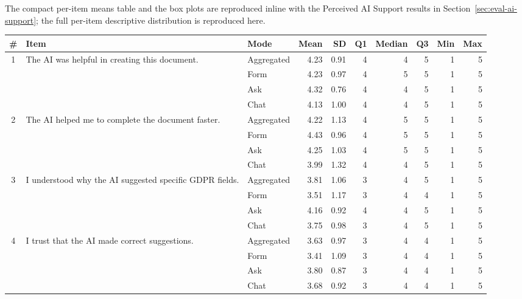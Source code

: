 The compact per-item means table and the box plots are reproduced
inline with the Perceived AI Support results in
Section~\ref{sec:eval-ai-support}; the full per-item descriptive
distribution is reproduced here.

\begin{table}
\centering
\small
\begin{tabularx}{\textheight}{@{}c X l r r r r r r r@{}}
\toprule
\# & Item & Mode & Mean & SD & Q1 & Median & Q3 & Min & Max \\
\midrule
\multirow{4}{*}{1} & \multirow{4}{*}{The AI was helpful in creating this document.}
                   & Aggregated  & 4.23 & 0.91 & 4 & 4 & 5 & 1 & 5 \\
                   & & Form & 4.23 & 0.97 & 4 & 5 & 5 & 1 & 5 \\
                   & & Ask  & 4.32 & 0.76 & 4 & 4 & 5 & 1 & 5 \\
                   & & Chat & 4.13 & 1.00 & 4 & 4 & 5 & 1 & 5 \\
\midrule
\multirow{4}{*}{2} & \multirow{4}{*}{The AI helped me to complete the document faster.}
                   & Aggregated  & 4.22 & 1.13 & 4 & 5 & 5 & 1 & 5 \\
                   & & Form & 4.43 & 0.96 & 4 & 5 & 5 & 1 & 5 \\
                   & & Ask  & 4.25 & 1.03 & 4 & 5 & 5 & 1 & 5 \\
                   & & Chat & 3.99 & 1.32 & 4 & 4 & 5 & 1 & 5 \\
\midrule
\multirow{4}{*}{3} & \multirow{4}{*}{I understood why the AI suggested specific GDPR fields.}
                   & Aggregated  & 3.81 & 1.06 & 3 & 4 & 5 & 1 & 5 \\
                   & & Form & 3.51 & 1.17 & 3 & 4 & 4 & 1 & 5 \\
                   & & Ask  & 4.16 & 0.92 & 4 & 4 & 5 & 1 & 5 \\
                   & & Chat & 3.75 & 0.98 & 3 & 4 & 5 & 1 & 5 \\
\midrule
\multirow{4}{*}{4} & \multirow{4}{*}{I trust that the AI made correct suggestions.}
                   & Aggregated  & 3.63 & 0.97 & 3 & 4 & 4 & 1 & 5 \\
                   & & Form & 3.41 & 1.09 & 3 & 4 & 4 & 1 & 5 \\
                   & & Ask  & 3.80 & 0.87 & 3 & 4 & 4 & 1 & 5 \\
                   & & Chat & 3.68 & 0.92 & 3 & 4 & 4 & 1 & 5 \\

\end{tabularx}
\end{table}
